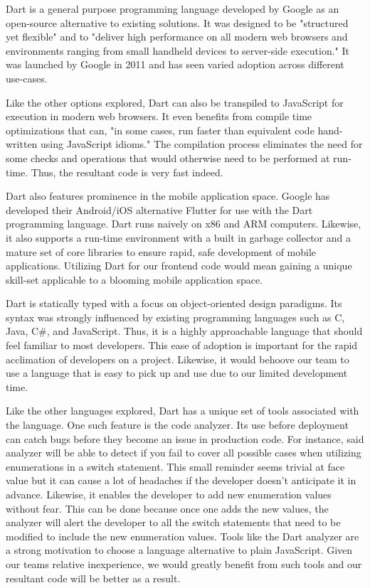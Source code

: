 \documentclass[12pt]{report}
\begin{document}
Dart is a general purpose programming language developed by Google as an open-source alternative to existing solutions.\cite{dartlaunch} It was designed to be "structured yet flexible" and to "deliver high performance on all modern web browsers and environments ranging from small handheld devices to server-side execution."\cite{dartlaunch} It was launched by Google in 2011 and has seen varied adoption across different use-cases.

Like the other options explored, Dart can also be transpiled to JavaScript for execution in modern web browsers. It even benefits from compile time optimizations that can, "in some cases, run faster than equivalent code hand-written using JavaScript idioms."\cite{darttalk} The compilation process eliminates the need for some checks and operations that would otherwise need to be performed at run-time. Thus, the resultant code is very fast indeed.

Dart also features prominence in the mobile application space. Google has developed their Android/iOS alternative Flutter for use with the Dart programming language.\cite{darthomepage} Dart runs naively on x86 and ARM computers. Likewise, it also supports a run-time environment with a built in garbage collector and a mature set of core libraries to ensure rapid, safe development of mobile applications. Utilizing Dart for our frontend code would mean gaining a unique skill-set applicable to a blooming mobile application space.

Dart is statically typed with a focus on object-oriented design paradigms. Its syntax was strongly influenced by existing programming languages such as C, Java, C\#, and JavaScript. Thus, it is a highly approachable language that should feel familiar to most developers. This ease of adoption is important for the rapid acclimation of developers on a project. Likewise, it would behoove our team to use a language that is easy to pick up and use due to our limited development time.

Like the other languages explored, Dart has a unique set of tools associated with the language. One such feature is the code analyzer. Its use before deployment can catch bugs before they become an issue in production code. For instance, said analyzer will be able to detect if you fail to cover all possible cases when utilizing enumerations in a switch statement. This small reminder seems trivial at face value but it can cause a lot of headaches if the developer doesn't anticipate it in advance. Likewise, it enables the developer to add new enumeration values without fear. This can be done because once one adds the new values, the analyzer will alert the developer to all the switch statements that need to be modified to include the new enumeration values. Tools like the Dart analyzer are a strong motivation to choose a language alternative to plain JavaScript. Given our teams relative inexperience, we would greatly benefit from such tools and our resultant code will be better as a result.
\end{document}
